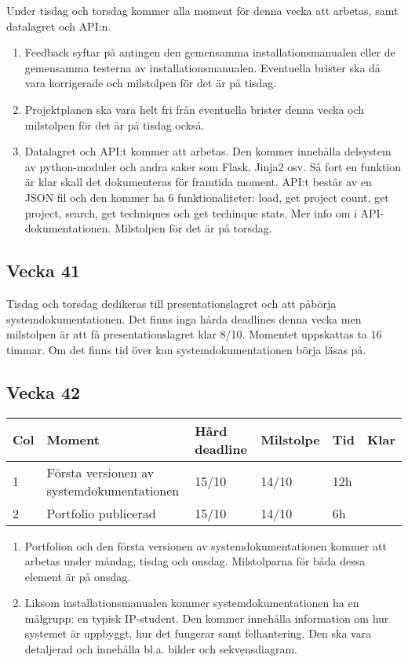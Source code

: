 \documentclass{TDP003mall}
\begin{document}
Under tisdag och torsdag kommer alla moment för denna vecka att arbetas, samt datalagret och API:n.

\begin{enumerate}
\item
  Feedback syftar på antingen den gemensamma installationsmanualen eller de gemensamma testerna av installationsmanualen. Eventuella brister ska då vara korrigerade och milstolpen för det är på tisdag.

\item
  Projektplanen ska vara helt fri från eventuella brister denna vecka och milstolpen för det är på tisdag också.

\item
  Datalagret och API:t kommer att arbetas. Den kommer innehålla delsystem av python-moduler och andra saker som Flask, Jinja2 osv. Så fort en funktion är klar skall det dokumenteras för framtida moment. API:t består av en JSON fil och den kommer ha 6 funktionaliteter: load, get project count, get project, search, get techniques och get techinque stats. Mer info om i API-dokumentationen. Milstolpen för det är på torsdag.
\end{enumerate}

\subsection*{Vecka 41}
Tisdag och torsdag dedikeras till presentationslagret och att påbörja systemdokumentationen. Det finns inga hårda deadlines denna vecka men milstolpen är att få presentationslagret klar 8/10. Momentet uppskattas ta 16 timmar. Om det finns tid över kan systemdokumentationen börja läsas på.

\subsection*{Vecka 42}
\begin{table}[!h]
\begin{tabularx}{\linewidth}{|l|X|l|l|l|l|}
\hline
Col & Moment & Hård deadline & Milstolpe & Tid & Klar \\\hline
1 & Första versionen av systemdokumentationen & 15/10 & 14/10 & 12h \\\hline
2 & Portfolio publicerad & 15/10 & 14/10 & 6h \\\hline
\end{tabularx}
\end{table}

\begin{enumerate}
\item
  Portfolion och den första versionen av systemdokumentationen kommer att arbetas under måndag, tisdag och onsdag. Milstolparna för båda dessa element är på onsdag.

\item
  Liksom installationsmanualen kommer systemdokumentationen ha en målgrupp: en typisk IP-student. Den kommer innehålla information om hur systemet är uppbyggt, hur det fungerar samt felhantering. Den ska vara detaljerad och innehålla bl.a. bilder och sekvensdiagram.
\end{enumerate}
\end{document}
